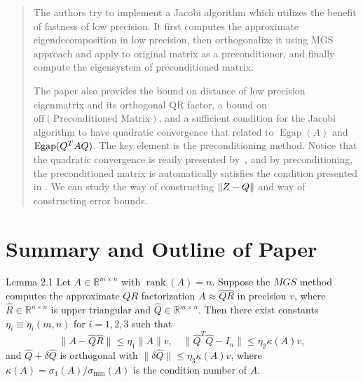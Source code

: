 \documentclass{article}
\begin{document}
\maketitle
\thispagestyle{firstpage} 

\begin{abstract}
    The authors try to implement a Jacobi algorithm which utilizes the
    benefit of fastness of low precision. It first computes the
    approximate eigendecomposition in low precision, then orthogonalize
    it using MGS approach and apply to original matrix as a
    preconditioner, and finally compute the eigensystem of
    preconditioned matrix. 
    
    The paper also provides the bound on distance
    of low precision eigenmatrix and its orthogonal QR factor, a bound
    on $\mathrm{off}(\text{Preconditioned Matrix})$, and a sufficient
    condition for the Jacobi algorithm to have quadratic convergence
    that related to $\operatorname{Egap}(A)$ and
    $\operatorname{Egap}(Q^{T} AQ)$. 
    The key element is the preconditioning method. Notice that the
    quadratic convergence is reaily presented by~\cite{Kempen1966}, and
    by preconditioning, the preconditioned matrix is automatically
    satisfies the condition presented in \cite{Kempen1966}.
    We can study the way of constructing $\|{Z-Q}\|$ and way of
    constructing error bounds.

\end{abstract}

\section{Summary and Outline of Paper}
\begin{lemma}
    \label{lemma.1.1}
    Lemma 2.1 Let $A \in \mathbb{R}^{m \times n}$ with
    $\operatorname{rank}(A)=n$. Suppose the $M G S$ method computes the
    approximate $Q R$ factorization $A \approx \widehat{Q} \widehat{R}$ in
    precision $v$, where $\widehat{R} \in \mathbb{R}^{n \times n}$ is upper
    triangular and $\widehat{Q} \in \mathbb{R}^{m \times n}$. Then there
    exist constants $\eta_i \equiv \eta_i(m, n)$ for $i=1,2,3$ such that 
    $$
    \|A-\widehat{Q} \widehat{R}\| \leq \eta_1\|A\| v, \quad\|\widehat{Q}^T \widehat{Q}-I_n\| \leq \eta_2 \kappa(A) v, 
    $$
    and $\widehat{Q}+\delta \widehat{Q}$ is orthogonal with $\|\delta \widehat{Q}\|
    \leq \eta_3 \kappa(A) v$, where $\kappa(A)=\sigma_1(A) /
    \sigma_{\min }(A)$ is the condition number of $A$. 
\end{lemma}
\end{document}
